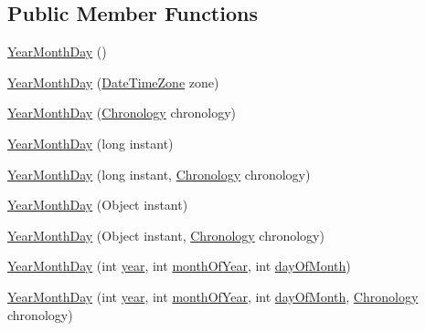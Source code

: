 \subsection*{Public Member Functions}
\begin{DoxyCompactItemize}
\item 
\hyperlink{classorg_1_1joda_1_1time_1_1_year_month_day_a31348b6f9187b5dd7a61e956bfc32cd6}{Year\-Month\-Day} ()
\item 
\hyperlink{classorg_1_1joda_1_1time_1_1_year_month_day_a227c9a38540c39a0f6c7b6221661e5a9}{Year\-Month\-Day} (\hyperlink{classorg_1_1joda_1_1time_1_1_date_time_zone}{Date\-Time\-Zone} zone)
\item 
\hyperlink{classorg_1_1joda_1_1time_1_1_year_month_day_a35d05193805bb6438effe0736ee7c50c}{Year\-Month\-Day} (\hyperlink{classorg_1_1joda_1_1time_1_1_chronology}{Chronology} chronology)
\item 
\hyperlink{classorg_1_1joda_1_1time_1_1_year_month_day_ad763de8fc7c22b2fbeb26f15ee42efb3}{Year\-Month\-Day} (long instant)
\item 
\hyperlink{classorg_1_1joda_1_1time_1_1_year_month_day_a18d955ea626587cf6793cbe0e230a8c7}{Year\-Month\-Day} (long instant, \hyperlink{classorg_1_1joda_1_1time_1_1_chronology}{Chronology} chronology)
\item 
\hyperlink{classorg_1_1joda_1_1time_1_1_year_month_day_a17e9e4ff66bb1dd61546324f45263e8d}{Year\-Month\-Day} (Object instant)
\item 
\hyperlink{classorg_1_1joda_1_1time_1_1_year_month_day_a969564417f2b7fa4a8f9d2f523fde490}{Year\-Month\-Day} (Object instant, \hyperlink{classorg_1_1joda_1_1time_1_1_chronology}{Chronology} chronology)
\item 
\hyperlink{classorg_1_1joda_1_1time_1_1_year_month_day_adac35a2da33089532e6a5c368c043e45}{Year\-Month\-Day} (int \hyperlink{classorg_1_1joda_1_1time_1_1_year_month_day_a0d4c3130ad3599f58c06b44b0cc3bb40}{year}, int \hyperlink{classorg_1_1joda_1_1time_1_1_year_month_day_aee12513f0a474e8f9d986f3b3b5c8f82}{month\-Of\-Year}, int \hyperlink{classorg_1_1joda_1_1time_1_1_year_month_day_a2f45a92b2d04d614dabb6d78d9d97e8a}{day\-Of\-Month})
\item 
\hyperlink{classorg_1_1joda_1_1time_1_1_year_month_day_ab0adddaa5386d30612bd7f4fa214198b}{Year\-Month\-Day} (int \hyperlink{classorg_1_1joda_1_1time_1_1_year_month_day_a0d4c3130ad3599f58c06b44b0cc3bb40}{year}, int \hyperlink{classorg_1_1joda_1_1time_1_1_year_month_day_aee12513f0a474e8f9d986f3b3b5c8f82}{month\-Of\-Year}, int \hyperlink{classorg_1_1joda_1_1time_1_1_year_month_day_a2f45a92b2d04d614dabb6d78d9d97e8a}{day\-Of\-Month}, \hyperlink{classorg_1_1joda_1_1time_1_1_chronology}{Chronology} chronology)

\end{DoxyCompactItemize}
